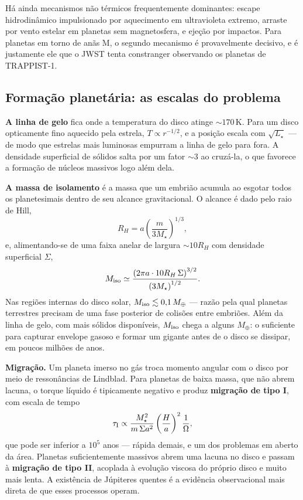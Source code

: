 \documentclass[11pt,a4paper]{article}
\begin{document}
Há ainda mecanismos não térmicos frequentemente dominantes: escape hidrodinâmico impulsionado por aquecimento em ultravioleta extremo, arraste por vento estelar em planetas sem magnetosfera, e ejeção por impactos. Para planetas em torno de anãs M, o segundo mecanismo é provavelmente decisivo, e é justamente ele que o JWST tenta constranger observando os planetas de TRAPPIST-1.

\subsection*{Formação planetária: as escalas do problema}

\textbf{A linha de gelo} fica onde a temperatura do disco atinge $\sim170\,\mathrm{K}$. Para um disco opticamente fino aquecido pela estrela, $T\propto r^{-1/2}$, e a posição escala com $\sqrt{L_\star}$ --- de modo que estrelas mais luminosas empurram a linha de gelo para fora. A densidade superficial de sólidos salta por um fator $\sim3$ ao cruzá-la, o que favorece a formação de núcleos massivos logo além dela.

\textbf{A massa de isolamento} é a massa que um embrião acumula ao esgotar todos os planetesimais dentro de seu alcance gravitacional. O alcance é dado pelo raio de Hill,
\[
R_H=a\left(\frac{m}{3M_\star}\right)^{1/3},
\]
e, alimentando-se de uma faixa anelar de largura $\sim10R_H$ com densidade superficial $\Sigma$,
\[
M_{\rm iso}\simeq\frac{\left(2\pi a\cdot 10R_H\,\Sigma\right)^{3/2}}{\left(3M_\star\right)^{1/2}}.
\]
Nas regiões internas do disco solar, $M_{\rm iso}\lesssim0{,}1\,M_\oplus$ --- razão pela qual planetas terrestres precisam de uma fase posterior de colisões entre embriões. Além da linha de gelo, com mais sólidos disponíveis, $M_{\rm iso}$ chega a alguns $M_\oplus$: o suficiente para capturar envelope gasoso e formar um gigante antes de o disco se dissipar, em poucos milhões de anos.

\textbf{Migração.} Um planeta imerso no gás troca momento angular com o disco por meio de ressonâncias de Lindblad. Para planetas de baixa massa, que não abrem lacuna, o torque líquido é tipicamente negativo e produz \textbf{migração de tipo I}, com escala de tempo
\[
\tau_{\rm I}\propto\frac{M_\star^{2}}{m\,\Sigma a^{2}}\left(\frac{H}{a}\right)^{2}\frac{1}{\Omega},
\]
que pode ser inferior a $10^{5}$ anos --- rápida demais, e um dos problemas em aberto da área. Planetas suficientemente massivos abrem uma lacuna no disco e passam à \textbf{migração de tipo II}, acoplada à evolução viscosa do próprio disco e muito mais lenta. A existência de Júpiteres quentes é a evidência observacional mais direta de que esses processos operam.
\end{document}
